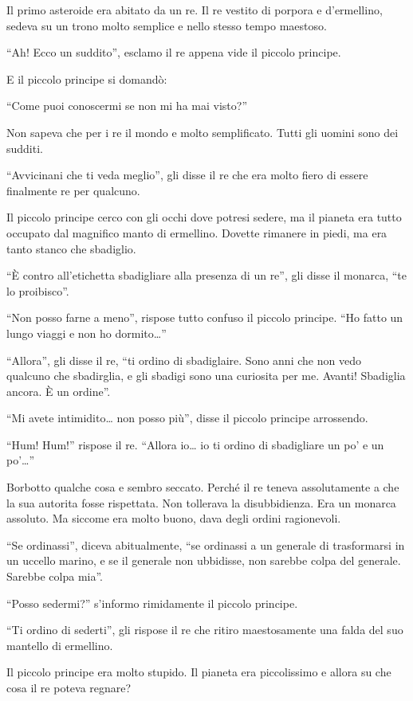 \documentclass[11pt]{scrbook}
\begin{document}
Il primo asteroide era abitato da un re. Il re vestito di porpora e
d'ermellino, sedeva su un trono molto semplice e nello stesso tempo
maestoso.

``Ah! Ecco un suddito'', esclamo il re appena vide il piccolo principe.

E il piccolo principe si domandò:

``Come puoi conoscermi se non mi ha mai visto?''

Non sapeva che per i re il mondo e molto semplificato. Tutti gli uomini
sono dei sudditi.

``Avvicinani che ti veda meglio'', gli disse il re che era molto fiero
di essere finalmente re per qualcuno.

Il piccolo principe cerco con gli occhi dove potresi sedere, ma il
pianeta era tutto occupato dal magnifico manto di ermellino. Dovette
rimanere in piedi, ma era tanto stanco che sbadiglio.

``È contro all'etichetta sbadigliare alla presenza di un re'', gli disse
il monarca, ``te lo proibisco''.

``Non posso farne a meno'', rispose tutto confuso il piccolo principe.
``Ho fatto un lungo viaggi e non ho dormito\ldots{}''

``Allora'', gli disse il re, ``ti ordino di sbadiglaire. Sono anni che
non vedo qualcuno che sbadirglia, e gli sbadigi sono una curiosita per
me. Avanti! Sbadiglia ancora. È un ordine''.

``Mi avete intimidito\ldots{} non posso più'', disse il piccolo principe
arrossendo.

``Hum! Hum!'' rispose il re. ``Allora io\ldots{} io ti ordino di
sbadigliare un po' e un po'\ldots{}''

Borbotto qualche cosa e sembro seccato. Perché il re teneva
assolutamente a che la sua autorita fosse rispettata. Non tollerava la
disubbidienza. Era un monarca assoluto. Ma siccome era molto buono, dava
degli ordini ragionevoli.

``Se ordinassi'', diceva abitualmente, ``se ordinassi a un generale di
trasformarsi in un uccello marino, e se il generale non ubbidisse, non
sarebbe colpa del generale. Sarebbe colpa mia''.

``Posso sedermi?'' s'informo rimidamente il piccolo principe.

``Ti ordino di sederti'', gli rispose il re che ritiro maestosamente una
falda del suo mantello di ermellino.

Il piccolo principe era molto stupido. Il pianeta era piccolissimo e
allora su che cosa il re poteva regnare?
\end{document}
